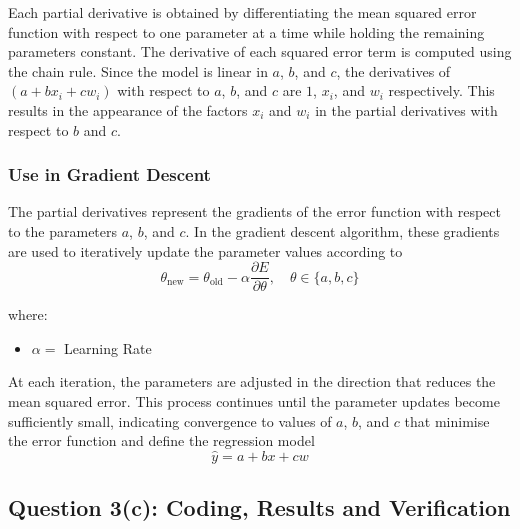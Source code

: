 \documentclass[12pt,a4paper,oneside]{report}
\begin{document}
Each partial derivative is obtained by differentiating the mean squared error
function with respect to one parameter at a time while holding the remaining
parameters constant. The derivative of each squared error term is computed using
the chain rule. Since the model is linear in $a$, $b$, and $c$, the derivatives of
$(a + b x_i + c w_i)$ with respect to $a$, $b$, and $c$ are $1$, $x_i$, and $w_i$
respectively. This results in the appearance of the factors $x_i$ and $w_i$ in the
partial derivatives with respect to $b$ and $c$.

\subsubsection*{Use in Gradient Descent}

The partial derivatives represent the gradients of the error function with respect
to the parameters $a$, $b$, and $c$. In the gradient descent algorithm, these
gradients are used to iteratively update the parameter values according to
\[
\theta_{\text{new}} = \theta_{\text{old}} - \alpha \frac{\partial E}{\partial \theta},
\quad \theta \in \{a, b, c\}
\]

where:
\begin{itemize}
    \item $\alpha =$ Learning Rate
\end{itemize}

At each iteration, the parameters are adjusted in the direction that reduces the
mean squared error. This process continues until the parameter updates become
sufficiently small, indicating convergence to values of $a$, $b$, and $c$ that
minimise the error function and define the regression model
\[
\hat{y} = a + b x + c w
\]

\subsection{Question 3(c): Coding, Results and Verification}
\end{document}
